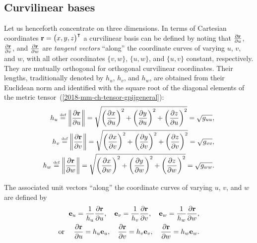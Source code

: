 \subsection{Curvilinear bases}

Let us henceforth concentrate on three dimensions. In terms of Cartesian coordinates
${\bf r}= \begin{pmatrix}x,y,z\end{pmatrix}^\intercal$
a curvilinear basis
can be defined by noting that
$
\frac{\partial  {\bf r}}{\partial u}$,
$\frac{\partial  {\bf r}}{\partial v}$, and
$\frac{\partial  {\bf r}}{\partial w}$
are {\em tangent vectors} ``along''  the coordinate curves of varying
$u$, $v$, and $w$, with all other coordinates $\{ v,w \}$, $\{ u,w \}$, and $\{ u,v \}$ constant, respectively.
They are mutually orthogonal for orthogonal curvilinear coordinates.
Their lengths, traditionally denoted by $h_u$, $h_v$, and $h_w$, are obtained from their Euclidean norm
and identified with the square root of the diagonal elements of the metric tensor~(\ref{2018-mm-ch-tensor-gpijgeneral}):
\begin{equation}
\begin{split}
h_u \stackrel{{\text{\tiny def}}}{=}   \left\| \frac{\partial  {\bf r}}{\partial u} \right\| =
\sqrt{ \left(\frac{\partial  x}{\partial u}\right)^2+
  \left(\frac{\partial  y}{\partial u}\right)^2+
  \left(\frac{\partial  z}{\partial u}\right)^2}  = \sqrt{g_{uu}}
,        \\
h_v \stackrel{{\text{\tiny def}}}{=}    \left\| \frac{\partial  {\bf r}}{\partial v} \right\| =
\sqrt{ \left(\frac{\partial  x}{\partial v}\right)^2+
  \left(\frac{\partial  y}{\partial v}\right)^2+
  \left(\frac{\partial  z}{\partial v}\right)^2} =\sqrt{g_{vv}}
,        \\
h_w \stackrel{{\text{\tiny def}}}{=}    \left\| \frac{\partial  {\bf r}}{\partial w} \right\| =
\sqrt{ \left(\frac{\partial  x}{\partial w}\right)^2+
  \left(\frac{\partial  y}{\partial w}\right)^2+
  \left(\frac{\partial  z}{\partial w}\right)^2}  =\sqrt{g_{ww}}
.
\end{split}
\label{2018-mm-ch-tensor-l}
\end{equation}

The associated unit vectors ``along''  the coordinate curves of varying
$u$, $v$, and $w$ are defined by
\begin{equation}
\begin{split}
{\bf e}_u = \frac{1}{ h_u } \frac{\partial  {\bf r}}{\partial u},\quad
{\bf e}_v = \frac{1}{ h_v } \frac{\partial  {\bf r}}{\partial v},\quad
{\bf e}_w = \frac{1}{ h_w } \frac{\partial  {\bf r}}{\partial w},
\\
\text{or }\quad
\frac{\partial  {\bf r}}{\partial u} = h_u {\bf e}_u,\quad
\frac{\partial  {\bf r}}{\partial v} = h_v {\bf e}_v,\quad
\frac{\partial  {\bf r}}{\partial w} = h_w {\bf e}_w
.
\end{split}
\label{2018-mm-ch-tensor-uv}
\end{equation}

